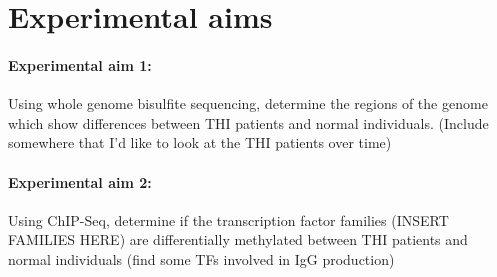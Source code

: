\documentclass[12pt]{article}
\newcommand{\naive}{na\"{i}ve }
\begin{document}
%
%		
%			
%		
%	
			
	\section{Experimental aims}
		
		\paragraph{Experimental aim 1:} Using whole genome bisulfite sequencing, determine the regions of the genome which show differences between THI patients and normal individuals. (Include somewhere that I'd like to look at the THI patients over time)
		
		\paragraph{Experimental aim 2:} Using ChIP-Seq, determine if the transcription factor families (INSERT FAMILIES HERE) are differentially methylated between THI patients and normal individuals (find some TFs involved in IgG production)
		
\end{document}
